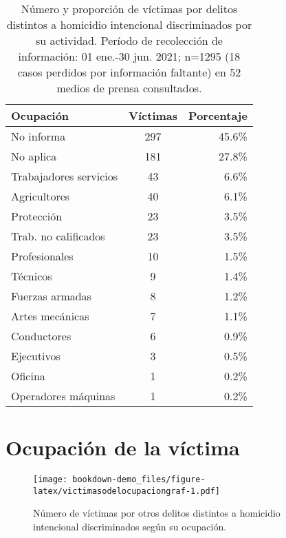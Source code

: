 \documentclass[
]{book}
\begin{document}
\begin{table}[left]

\caption{\label{tab:victimasodelactividadtable}Número y proporción de víctimas por delitos distintos a homicidio intencional discriminados por su actividad. Período de recolección de información: 01 ene.-30 jun. 2021; n=1295 (18 casos perdidos por información faltante) en 52 medios de prensa consultados.}
\centering
\begin{tabular}[t]{lcr}
\toprule
Ocupación & Víctimas & Porcentaje\\
\midrule
No informa & 297 & 45.6\%\\
No aplica & 181 & 27.8\%\\
Trabajadores servicios & 43 & 6.6\%\\
Agricultores & 40 & 6.1\%\\
Protección & 23 & 3.5\%\\
\addlinespace
Trab. no calificados & 23 & 3.5\%\\
Profesionales & 10 & 1.5\%\\
Técnicos & 9 & 1.4\%\\
Fuerzas armadas & 8 & 1.2\%\\
Artes mecánicas & 7 & 1.1\%\\
\addlinespace
Conductores & 6 & 0.9\%\\
Ejecutivos & 3 & 0.5\%\\
Oficina & 1 & 0.2\%\\
Operadores máquinas & 1 & 0.2\%\\
\bottomrule
\end{tabular}
\end{table}

\hypertarget{ocupaciuxf3n-de-la-vuxedctima-2}{%
\section{Ocupación de la víctima}\label{ocupaciuxf3n-de-la-vuxedctima-2}}



\begin{figure}
\centering
\texttt{[image: bookdown-demo\_files/figure-latex/victimasodelocupaciongraf-1.pdf]}
\caption{\label{fig:victimasodelocupaciongraf}Número de víctimas por otros delitos distintos a homicidio intencional discriminados según su ocupación.}
\end{figure}
\end{document}

